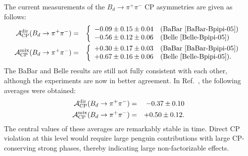 \documentclass[11pt]{cernrep}
\begin{document}
The current measurements of the $B_d\to\pi^+\pi^-$ CP asymmetries 
are given as follows:
\begin{eqnarray}
{\cal A}_{\rm CP}^{\rm dir}(B_d\to\pi^+\pi^-)
&=&\left\{
\begin{array}{ll}
-0.09\pm0.15\pm0.04 & \mbox{(BaBar \cite{BaBar-Bpipi-05})}\\
-0.56\pm0.12\pm0.06 & \mbox{(Belle \cite{Belle-Bpipi-05})}
\end{array}
\right.\label{Adir-exp}\\
{\cal A}_{\rm CP}^{\rm mix}(B_d\to\pi^+\pi^-)
&=&\left\{
\begin{array}{ll}
+0.30\pm0.17\pm0.03& \mbox{(BaBar \cite{BaBar-Bpipi-05})}\\
+0.67\pm0.16\pm0.06 & \mbox{(Belle \cite{Belle-Bpipi-05}).}
\end{array}
\right.\label{Amix-exp}
\end{eqnarray}
The BaBar and Belle results are still not fully consistent with each other, 
although the experiments are now in better agreement. In Ref.~\cite{HFAG}, 
the following averages were obtained:
\begin{eqnarray}
{\cal A}_{\rm CP}^{\rm dir}(B_d\to\pi^+\pi^-)&=&-0.37\pm0.10
\label{Bpipi-CP-averages}\\
{\cal A}_{\rm CP}^{\rm mix}(B_d\to\pi^+\pi^-)&=&+0.50\pm0.12.
\label{Bpipi-CP-averages2}
\end{eqnarray}
The central values of these averages are remarkably stable
in time. Direct CP violation at this level would require large penguin 
contributions with large CP-conserving strong phases, thereby indicating
large non-factorizable effects. 
\end{document}
